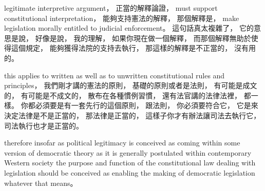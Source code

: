 \hypertarget{w02:cue:160}{}legitimate interpretive argument，
\hypertarget{w02:cue:161}{}正當的解釋論證，
\hypertarget{w02:cue:162}{}must support constitutional interpretation，
\hypertarget{w02:cue:163}{}能夠支持憲法的解釋，
\hypertarget{w02:cue:164}{}那個解釋是，
\hypertarget{w02:cue:165}{}make legislation morally entitled to judicial enforcement。
\hypertarget{w02:cue:166}{}這句話真太複雜了，
\hypertarget{w02:cue:167}{}它的意思是說，
\hypertarget{w02:cue:168}{}好像是說，
\hypertarget{w02:cue:169}{}我的理解，
\hypertarget{w02:cue:170}{}如果你現在做一個解釋，
\hypertarget{w02:cue:171}{}而那個解釋無助於使得這個規定，
\hypertarget{w02:cue:172}{}能夠獲得法院的支持去執行，
\hypertarget{w02:cue:173}{}那這樣的解釋是不正當的，
\hypertarget{w02:cue:174}{}沒有用的。

\hypertarget{w02:cue:175}{}this applies to written as well as to unwritten constitutional rules and principles，
\hypertarget{w02:cue:176}{}我們剛才講的憲法的原則，
\hypertarget{w02:cue:177}{}基礎的原則或者是法則，
\hypertarget{w02:cue:178}{}有可能是成文的，
\hypertarget{w02:cue:179}{}有可能是不成文的，
\hypertarget{w02:cue:180}{}散布在各種慣例習慣，
\hypertarget{w02:cue:181}{}還有法官講的法律法裡，
\hypertarget{w02:cue:182}{}都一樣。
\hypertarget{w02:cue:183}{}你都必須要是有一套先行的這個原則，
\hypertarget{w02:cue:184}{}跟法則，
\hypertarget{w02:cue:185}{}你必須要符合它，
\hypertarget{w02:cue:186}{}它是來決定法律是不是正當的，
\hypertarget{w02:cue:187}{}那法律是正當的，
\hypertarget{w02:cue:188}{}這樣子你才有辦法讓司法去執行它，
\hypertarget{w02:cue:189}{}司法執行也才是正當的。

\hypertarget{w02:cue:190}{}therefore
\hypertarget{w02:cue:191}{}insofar as political legitimacy
\hypertarget{w02:cue:192}{}is conceived as coming within some version of democratic theory
\hypertarget{w02:cue:193}{}as it is generally postulated within contemporary Western society
\hypertarget{w02:cue:194}{}the purpose and function of the constitutional law
\hypertarget{w02:cue:195}{}dealing with legislation should be conceived as enabling the making of democratic legislation
\hypertarget{w02:cue:196}{}whatever that means。

